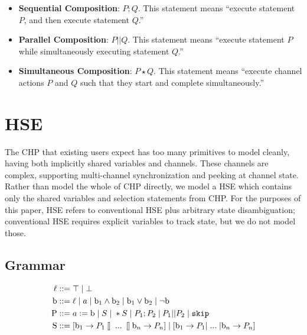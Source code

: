 \documentclass[times, 10pt]{article}
\def\Skip{\hbox{\tt skip}}
\begin{document}
\begin{itemize}
\item \textbf{Sequential Composition}: $P;Q$.  This statement means ``execute
statement $P$, and then execute statement $Q$.''

\item \textbf{Parallel Composition}: $P || Q$.  This statement means ``execute
statement $P$ while simultaneously executing statement $Q$.''

\item \textbf{Simultaneous Composition}: $P \star Q$.  This statement means
``execute channel actions $P$ and $Q$ such that they start and complete
simultaneously.''

\end{itemize}

\section{HSE}

The CHP that existing users expect has too many primitives to model cleanly,
having both implicitly shared variables and channels. These channels are
complex, supporting multi-channel synchronization and peeking at channel state.
Rather than model the whole of CHP directly, we model a HSE which contains only
the shared variables and selection statements from CHP.  For the purposes of
this paper, HSE refers to conventional HSE plus arbitrary state disambiguation;
conventional HSE requires explicit variables to track state, but we do not model
those.

\subsection{Grammar}
\begin{align*}
\mathrm{\ell} & :: = \top \; | \; \bot \\
\mathrm{b} & ::= \ell \; | \;  a \; | \;
                 \mathrm{b}_1 \wedge \mathrm{b}_2 \; | \;
                 \mathrm{b}_1 \vee \mathrm{b}_2 \; | \;
                 \lnot \mathrm{b} \\
\mathrm{P} & ::= a := \mathrm{b} \; | \; S \; | \; *S \; | \;
                 P_1; P_2 \; | \: P_1 || P_2 \; | \;
                 \mathtt{\Skip} \\
\mathrm{S} & ::=
    [ \mathrm{b}_1 \rightarrow P_1  \talloblong \; ... \;
      \talloblong \mathrm{b}_n \rightarrow P_n ] \; | \;
    [ \mathrm{b}_1 \rightarrow P_1 | \; ... \; | \mathrm{b}_n \rightarrow P_n ]
\end{align*}
\end{document}
